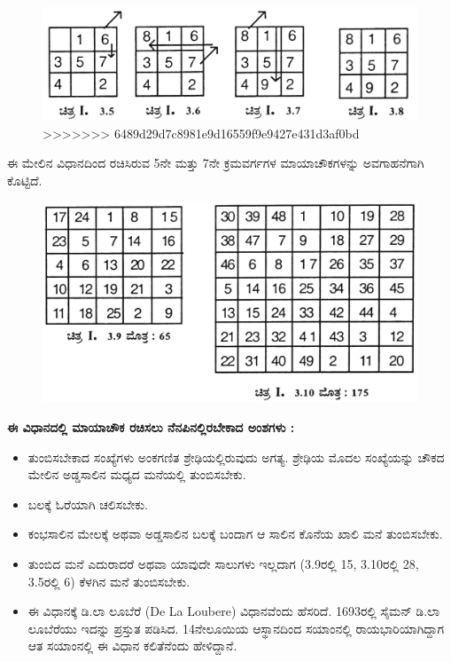 \begin{itemize}
\newpage

	\begin{figure}[h]
	\includegraphics{src/figures/chap3/fig3.7.jpg}
>>>>>>> 6489d29d7c8981e9d16559f9e9427e431d3af0bd
	\end{figure}

	ಈ ಮೇಲಿನ ವಿಧಾನದಿಂದ ರಚಿಸಿರುವ 5ನೇ ಮತ್ತು 7ನೇ ಕ್ರಮವರ್ಗಗಳ ಮಾಯಾಚೌಕಗಳನ್ನು ಅವಗಾಹನೆಗಾಗಿ ಕೊಟ್ಟಿದೆ.
	\begin{figure}[h]
	\includegraphics{src/figures/chap3/fig3-8.jpg}
	\end{figure}
\end{itemize}

\noindent \textbf{ಈ ವಿಧಾನದಲ್ಲಿ ಮಾಯಾಚೌಕ ರಚಿಸಲು ನೆನಪಿನಲ್ಲಿರಬೇಕಾದ ಅಂಶಗಳು :}
\begin{itemize}
\itemsep=7pt
	\item ತುಂಬಿಸಬೇಕಾದ ಸಂಖ್ಯೆಗಳು ಅಂಕಗಣಿತ ಶ್ರೇಢಿಯಲ್ಲಿರುವುದು ಅಗತ್ಯ. ಶ್ರೇಢಿಯ ಮೊದಲ ಸಂಖ್ಯೆಯನ್ನು ಚೌಕದ ಮೇಲಿನ ಅಡ್ಡಸಾಲಿನ ಮಧ್ಯದ ಮನೆಯಲ್ಲಿ ತುಂಬಿಸ\-ಬೇಕು.
	\item ಬಲಕ್ಕೆ ಓರೆಯಾಗಿ ಚಲಿಸಬೇಕು.
	\item ಕಂಭಸಾಲಿನ ಮೇಲಕ್ಕೆ ಅಥವಾ ಅಡ್ಡಸಾಲಿನ ಬಲಕ್ಕೆ ಬಂದಾಗ ಆ ಸಾಲಿನ ಕೊನೆಯ ಖಾಲಿ ಮನೆ ತುಂಬಿಸಬೇಕು.
	\item ತುಂಬಿದ ಮನೆ ಎದುರಾದರೆ ಅಥವಾ ಯಾವುದೇ ಸಾಲುಗಳು ಇಲ್ಲದಾಗ (3.9ರಲ್ಲಿ 15, 3.10ರಲ್ಲಿ 28, 3.5ರಲ್ಲಿ 6) ಕೆಳಗಿನ ಮನೆ ತುಂಬಿಸಬೇಕು.
	\item ಈ ವಿಧಾನಕ್ಕೆ ಡಿ.ಲಾ ಲೂಬೆರೆ (De La Loubere) ವಿಧಾನವೆಂದು ಹೆಸರಿದೆ. 1693ರಲ್ಲಿ ಸೈಮನ್ ಡಿ.ಲಾ ಲೂಬೆರೆಯು ಇದನ್ನು ಪ್ರಸ್ತುತ ಪಡಿಸಿದ. 14ನೇ\break ಲೂಯಿಯ ಆಸ್ಥಾನದಿಂದ ಸಯಾಂನಲ್ಲಿ ರಾಯಭಾರಿಯಾಗಿದ್ದಾಗ ಆತ ಸಯಾಂನಲ್ಲಿ ಈ ವಿಧಾನ ಕಲಿತೆನೆಂದು ಹೇಳಿದ್ದಾನೆ.
\end{itemize}

